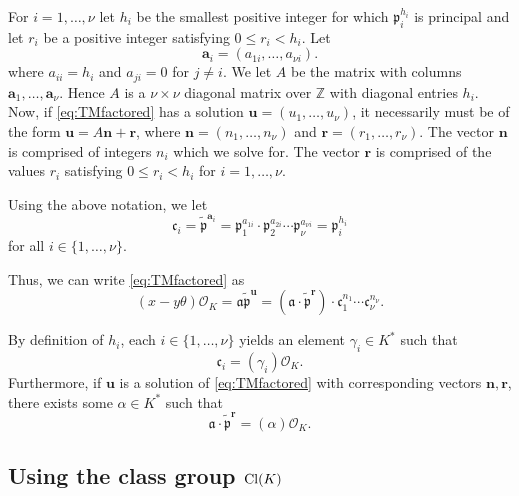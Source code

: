 For $i = 1, \dots, {\nu}$ let $h_i$ be the smallest positive integer for which $\mathfrak{p}_i^{h_i}$ is principal and let 
$r_i$ be a positive integer satisfying $0 \leq r_i < h_i$. Let
\[\mathbf{a}_i = (a_{1i}, \dots, a_{{\nu}i}).\]
where $a_{ii} = h_i$ and $a_{ji} = 0$ for $j \neq i$. We let $A$ be the matrix with columns $\mathbf{a}_1, \dots, \mathbf{a}_{\nu}$. Hence $A$ is a $\nu \times \nu$ diagonal matrix over $\mathbb{Z}$ with diagonal entries $h_i$. Now, if \eqref{eq:TMfactored} has a solution $\mathbf{u} = (u_1, \dots, u_{\nu})$, it necessarily must be of the form $\mathbf{u} = A\mathbf{n} + \mathbf{r}$, where $\mathbf{n} = (n_1, \dots, n_{\nu})$ and $\mathbf{r} = (r_1, \dots, r_{\nu})$. The vector $\mathbf{n}$ is comprised of integers $n_i$ which we solve for. The vector $\mathbf{r}$ is comprised of the values $r_i$ satisfying $0 \leq r_i < h_i$ for $i = 1, \dots, \nu$. 

Using the above notation, we let
\[\mathfrak{c}_i = \tilde{\mathfrak{p}}^{\mathbf{a}_i}=\mathfrak{p}_1^{a_{1i}}\cdot \mathfrak{p}_2^{a_{2i}} \cdots \mathfrak{p}_{\nu}^{a_{{\nu}i}} = \mathfrak{p}_i^{h_i} \]
for all $i \in \{1, \dots, {\nu}\}$.

Thus, we can write \eqref{eq:TMfactored} as
\[ (x-y\theta) \mathcal{O}_K = \mathfrak{a} \tilde{\mathfrak{p}}^{\mathbf{u}}  = (\mathfrak{a} \cdot \tilde{\mathfrak{p}}^\mathbf{r}) \cdot \mathfrak{c}_1^{n_1}\cdots \mathfrak{c}_{\nu}^{n_{\nu}}.\]


By definition of $h_i$, each $i \in \{1, \dots, {\nu}\}$ yields an element $\gamma_i \in K^*$ such that 
\[\mathfrak{c}_i = (\gamma_i) \mathcal{O}_K.\]
Furthermore, if $\mathbf{u}$ is a solution of \eqref{eq:TMfactored} with corresponding vectors $\mathbf{n}, \mathbf{r}$, there exists some $\alpha \in K^*$ such that 
\[\mathfrak{a} \cdot \tilde{\mathfrak{p}}^\mathbf{r}= (\alpha)\mathcal{O}_K.\]


\subsection{Using the class group $\operatorname{Cl}(K)$}
\label{subsec:FactorizationTMwithOK}

